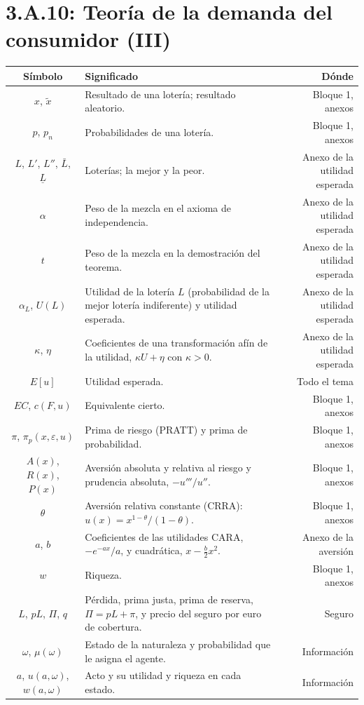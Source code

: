 \documentclass[10pt,a4paper]{article}
\newcommand{\cabecera}{\toprule\textbf{Símbolo} & \textbf{Significado} & \textbf{Dónde}\\\midrule\endhead\bottomrule\endfoot}
\begin{document}
\section{3.A.10: Teoría de la demanda del consumidor (III)}
\begin{longtable}{SMD}
\cabecera
$x$, $\tilde x$ & Resultado de una lotería; resultado aleatorio. & Bloque 1, anexos\\
$p$, $p_n$ & Probabilidades de una lotería. & Bloque 1, anexos\\
$L$, $L'$, $L''$, $\bar L$, $\underline L$ & Loterías; la mejor y la peor. & Anexo de la utilidad esperada\\
$\alpha$ & Peso de la mezcla en el axioma de independencia. & Anexo de la utilidad esperada\\
$t$ & Peso de la mezcla en la demostración del teorema. & Anexo de la utilidad esperada\\
$\alpha_L$, $U(L)$ & Utilidad de la lotería $L$ (probabilidad de la mejor lotería indiferente) y utilidad esperada. & Anexo de la utilidad esperada\\
$\kappa$, $\eta$ & Coeficientes de una transformación afín de la utilidad, $\kappa U+\eta$ con $\kappa>0$. & Anexo de la utilidad esperada\\
$E[u]$ & Utilidad esperada. & Todo el tema\\
$EC$, $c(F,u)$ & Equivalente cierto. & Bloque 1, anexos\\
$\pi$, $\pi_p(x,\varepsilon,u)$ & Prima de riesgo (PRATT) y prima de probabilidad. & Bloque 1, anexos\\
$A(x)$, $R(x)$, $P(x)$ & Aversión absoluta y relativa al riesgo y prudencia absoluta, $-u'''/u''$. & Bloque 1, anexos\\
$\theta$ & Aversión relativa constante (CRRA): $u(x)=x^{1-\theta}/(1-\theta)$. & Bloque 1, anexos\\
$a$, $b$ & Coeficientes de las utilidades CARA, $-e^{-ax}/a$, y cuadrática, $x-\tfrac b2x^2$. & Anexo de la aversión\\
$w$ & Riqueza. & Bloque 1, anexos\\
$L$, $pL$, $\Pi$, $q$ & Pérdida, prima justa, prima de reserva, $\Pi=pL+\pi$, y precio del seguro por euro de cobertura. & Seguro\\
$\omega$, $\mu(\omega)$ & Estado de la naturaleza y probabilidad que le asigna el agente. & Información\\
$a$, $u(a,\omega)$, $w(a,\omega)$ & Acto y su utilidad y riqueza en cada estado. & Información\\

\end{longtable}
\end{document}
